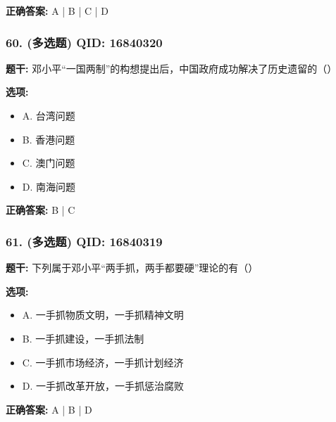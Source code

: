 \documentclass[12pt,UTF8]{ctexart}
\begin{document}
\textbf{正确答案:}
A | B | C | D

\vspace{0.3em}\hrulefill\vspace{0.7em}

\subsubsection*{60. (多选题) \small QID: 16840320}

\textbf{题干:}
邓小平“一国两制”的构想提出后，中国政府成功解决了历史遗留的（）

\textbf{选项:}
\begin{itemize}[leftmargin=*]

  \item A. 台湾问题

  \item B. 香港问题

  \item C. 澳门问题

  \item D. 南海问题

\end{itemize}

\textbf{正确答案:}
B | C

\vspace{0.3em}\hrulefill\vspace{0.7em}

\subsubsection*{61. (多选题) \small QID: 16840319}

\textbf{题干:}
下列属于邓小平“两手抓，两手都要硬”理论的有（）

\textbf{选项:}
\begin{itemize}[leftmargin=*]

  \item A. 一手抓物质文明，一手抓精神文明

  \item B. 一手抓建设，一手抓法制

  \item C. 一手抓市场经济，一手抓计划经济

  \item D. 一手抓改革开放，一手抓惩治腐败

\end{itemize}

\textbf{正确答案:}
A | B | D

\vspace{0.3em}\hrulefill\vspace{0.7em}
\end{document}
